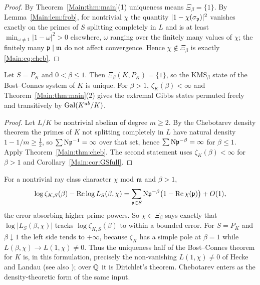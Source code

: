 \begin{proof}
By Theorem~\ref{Main:thm:main}(1) uniqueness means $\Xi_\beta=\{1\}$. By
Lemma~\ref{Main:lem:frob}, for nontrivial $\chi$ the quantity
$|1-\chi(\sigma_{\mathfrak{p}})|^2$ vanishes exactly on the primes of $S$ splitting
completely in $L$ and is at least $\min_{\omega\neq1}|1-\omega|^2>0$ elsewhere,
$\omega$ ranging over the finitely many values of $\chi$; the finitely many
$\mathfrak{p}\mid\mathfrak{m}$ do not affect convergence. Hence $\chi\notin\Xi_\beta$ is exactly
\eqref{Main:eq:cheb}.
\end{proof}

\begin{corollary}\label{Main:cor:full}
Let $S=P_K$ and $0<\beta\le1$. Then $\Xi_\beta(K,P_K)=\{1\}$, so the
$\mathrm{KMS}_\beta$ state of the Bost--Connes system of $K$ is unique. For
$\beta>1$, $\zeta_K(\beta)<\infty$ and Theorem~\ref{Main:thm:main}(2) gives the
extremal Gibbs states permuted freely and transitively by $\operatorname{Gal}(K^{ab}/K)$.
\end{corollary}

\begin{proof}
Let $L/K$ be nontrivial abelian of degree $m\ge2$. By the Chebotarev density
theorem the primes of $K$ not splitting completely in $L$ have natural density
$1-1/m\ge\tfrac12$, so $\sum\mathrm{N}\mathfrak{p}^{-1}=\infty$ over that set, hence
$\sum\mathrm{N}\mathfrak{p}^{-\beta}=\infty$ for $\beta\le1$. Apply Theorem~\ref{Main:thm:cheb}. The
second statement uses $\zeta_K(\beta)<\infty$ for $\beta>1$ and
Corollary~\ref{Main:cor:GSfull}.
\end{proof}

\begin{remark}[$L$-functions]\label{Main:rem:Lfunction}
For a nontrivial ray class character $\chi$ mod $\mathfrak{m}$ and $\beta>1$,
\[
\log\zeta_{K,S}(\beta)-\operatorname{Re}\log L_S(\beta,\chi)
=\sum_{\mathfrak{p}\in S}\mathrm{N}\mathfrak{p}^{-\beta}\bigl(1-\operatorname{Re}\chi(\mathfrak{p})\bigr)+O(1),
\]
the error absorbing higher prime powers. So $\chi\in\Xi_\beta$ says exactly that
$\log|L_S(\beta,\chi)|$ tracks $\log\zeta_{K,S}(\beta)$ to within a bounded
error. For $S=P_K$ and $\beta\downarrow1$ the left side tends to $+\infty$,
because $\zeta_K$ has a simple pole at $\beta=1$ while $L(\beta,\chi)\to L(1,\chi)\neq0$.
Thus the uniqueness half of the Bost--Connes theorem for $K$ is, in this
formulation, precisely the non-vanishing $L(1,\chi)\neq0$ of Hecke \cite{Hecke} and Landau \cite{Landau}
(see also \cite[Ch.~VII]{Neukirch});
over $\mathbb{Q}$ it is Dirichlet's theorem. Chebotarev enters as the density-theoretic
form of the same input.
\end{remark}

